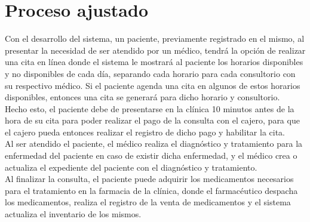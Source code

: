 \section{Proceso ajustado}


Con el desarrollo del sistema, un paciente, previamente registrado en el mismo, al presentar la necesidad de ser atendido por un médico, tendrá la opción de realizar una cita en línea donde el sistema le mostrará al paciente los horarios disponibles y no disponibles de cada día, separando cada horario para cada consultorio con su respectivo médico. Si el paciente agenda una cita en algunos de estos horarios disponibles, entonces una cita se generará para dicho horario y consultorio.\\ 

Hecho esto, el paciente debe de presentarse en la clínica 10 minutos antes de la hora de su cita para poder realizar el pago de la consulta con el cajero, para que el cajero pueda entonces realizar el registro de dicho pago y habilitar la cita.\\

Al ser atendido el paciente, el médico realiza el diagnóstico y tratamiento para la enfermedad del paciente en caso de existir dicha enfermedad, y el médico crea o actualiza el expediente del paciente con el diagnóstico y tratamiento.\\

Al finalizar la consulta, el paciente puede adquirir los medicamentos necesarios para el tratamiento en la farmacia de la clínica, donde el farmacéutico despacha los medicamentos, realiza el registro de la venta de medicamentos y el sistema actualiza el inventario de los mismos.\\

